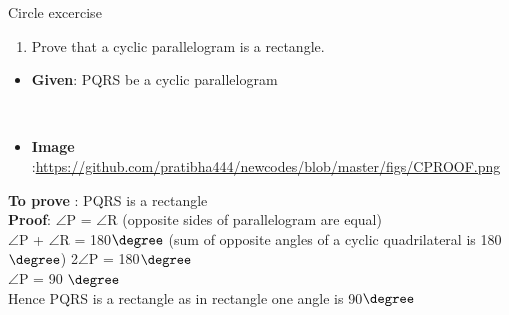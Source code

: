 \begin{frame}{Circle excercise}
\begin{enumerate}
\conti
\item Prove that a cyclic parallelogram is a rectangle.
\end{enumerate}
\begin{itemize}
\item \textbf{Given}: PQRS be a cyclic parallelogram

\\

\item\textbf{Image} :\url{https://github.com/pratibha444/newcodes/blob/master/figs/CPROOF.png}\\

\end{itemize}
\seti
\end{frame}
\begin{frame}
\textbf{To prove} : PQRS is a rectangle\\
\textbf{Proof}: $\angle$P = $\angle$R (opposite sides of parallelogram are equal)\\
$\angle$P + $\angle$R = 180$\degree$ (sum of opposite angles of a cyclic quadrilateral is 180$\degree$)
2$\angle$P = 180$\degree$\\
$\angle$P = 90 $\degree$\\
Hence PQRS is a rectangle as in rectangle one angle is 90$\degree$\\
\end{frame}